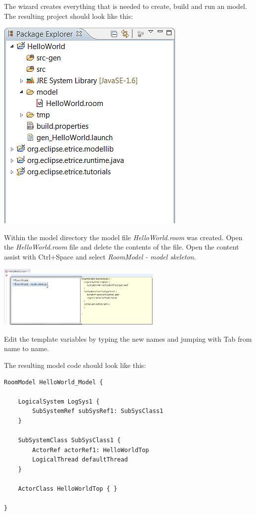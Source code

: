 The wizard creates everything that is needed to create, build and run an \eTrice{} model. The resulting 
project should look like this:

\includegraphics{images/015-HelloWorld11.png}

Within the model directory the model file \emph{HelloWorld.room} was created. Open the 
\emph{HelloWorld.room} file and delete the contents of the file. Open the content assist with Ctrl+Space 
and select \emph{RoomModel - model skeleton}.

\includegraphics[width=0.6\textwidth]{images/015-HelloWorld12.png}

Edit the template variables by typing the new names and jumping with Tab from name to name.

The resulting model code should look like this:

\begin{lstlisting}[language=ROOM]
RoomModel HelloWorld_Model {

	LogicalSystem LogSys1 {
		SubSystemRef subSysRef1: SubSysClass1
	}

	SubSystemClass SubSysClass1 {
		ActorRef actorRef1: HelloWorldTop
		LogicalThread defaultThread
	}

	ActorClass HelloWorldTop { }

}
\end{lstlisting}

